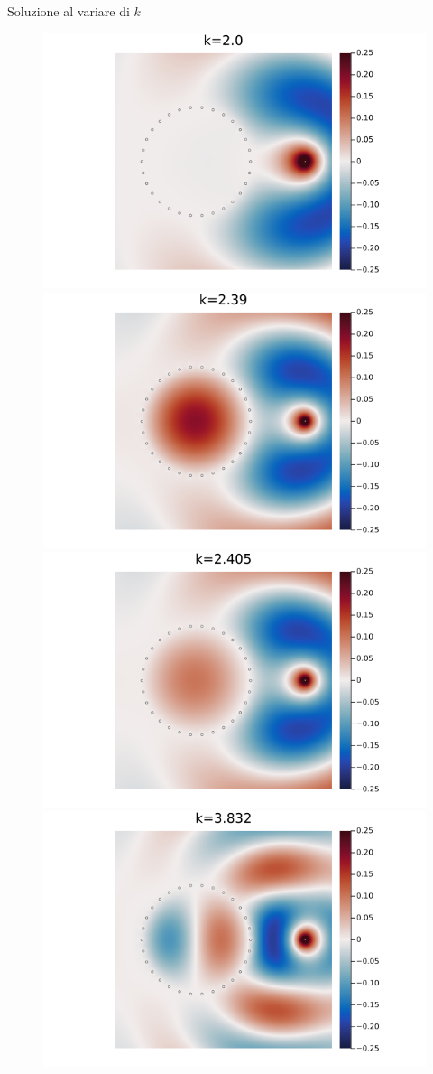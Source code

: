 \documentclass{beamer}
\begin{document}
	\begin{frame}{Soluzione al variare di $k$}
		\begin{figure}
			\includegraphics[width=.48\textwidth]{figs/resonant_plot_1.png}\hfil\includegraphics[width=.48\textwidth]{figs/resonant_plot_2.png}
			\includegraphics[width=.48\textwidth]{figs/resonant_plot_3.png}\hfil\includegraphics[width=.48\textwidth]{figs/resonant_plot_4.png}
		\end{figure}
	\end{frame}
	
	
\end{document}
